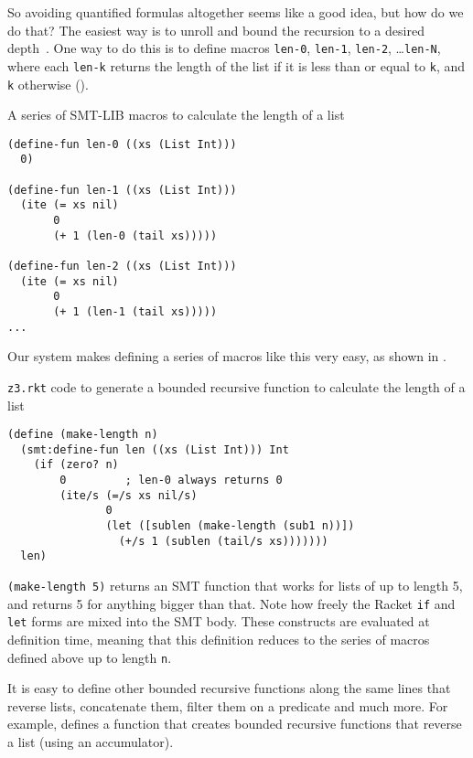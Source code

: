 So avoiding quantified formulas altogether seems like a good idea, but how do
we do that? The easiest way is to unroll and bound the recursion to a desired
depth~\cite{sat-recursive}. One way to do this is to define macros
\texttt{len-0}, \texttt{len-1}, \texttt{len-2}, \ldots \texttt{len-N}, where
each \texttt{len-k} returns the length of the list if it is less than or equal
to \texttt{k}, and \texttt{k} otherwise ().

\begin{program}
\caption{A series of SMT-LIB macros to calculate the length of a list}
\label{fig:len-macros}
\begin{verbatim}
(define-fun len-0 ((xs (List Int)))
  0)

(define-fun len-1 ((xs (List Int)))
  (ite (= xs nil)
       0
       (+ 1 (len-0 (tail xs)))))

(define-fun len-2 ((xs (List Int)))
  (ite (= xs nil)
       0
       (+ 1 (len-1 (tail xs)))))
...
\end{verbatim}
\end{program}

Our system makes defining a series of macros like this very easy, as shown in
.

\begin{program}
\caption{\texttt{z3.rkt} code to generate a bounded recursive function to calculate the length of a list}
\label{fig:len-rkt}
\begin{verbatim}
(define (make-length n)
  (smt:define-fun len ((xs (List Int))) Int
    (if (zero? n)
        0         ; len-0 always returns 0
        (ite/s (=/s xs nil/s)
               0
               (let ([sublen (make-length (sub1 n))])
                 (+/s 1 (sublen (tail/s xs)))))))
  len)
\end{verbatim}
\end{program}

\texttt{(make-length 5)} returns an SMT function that works for lists of up to
length 5, and returns 5 for anything bigger than that. Note how freely the
Racket \texttt{if} and \texttt{let} forms are mixed into the SMT body. These
constructs are evaluated at definition time, meaning that this definition
reduces to the series of macros defined above up to length \texttt{n}.

It is easy to define other bounded recursive functions along the same lines
that reverse lists, concatenate them, filter them on a predicate and much
more. For example,  defines a function that creates
bounded recursive functions that reverse a list (using an accumulator).

